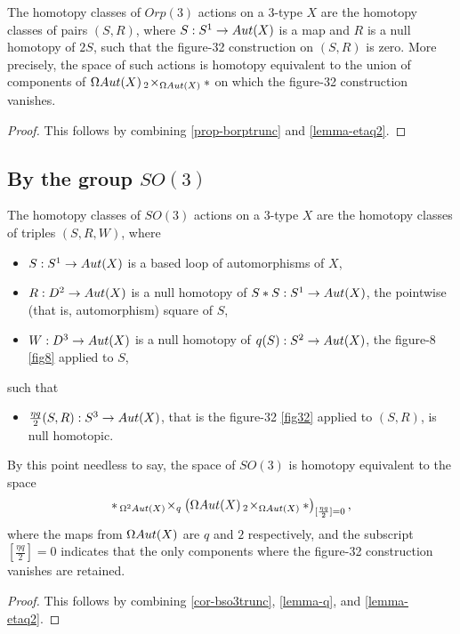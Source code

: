 \documentclass{amsart}
\begin{document}
\begin{proposition} 
\label{prop-orpaction}
The homotopy classes of $Orp(3)$ actions on a 3-type $X$ are the homotopy classes of pairs $(S,R)$, where $S: S^1 \rightarrow Aut(X)$ is a map and $R$ is a null homotopy of $2S$, such that the figure-32 construction on $(S,R)$ is zero.  More precisely, the space of such actions is homotopy equivalent to the union of components of $\Omega Aut(X) \,_2\! \times_{\Omega Aut(X)} \ast$ on which the figure-32 construction vanishes.
\end{proposition}
\begin{proof}
This follows by combining \cref{prop-borptrunc} and \cref{lemma-etaq2}.
\end{proof}



\subsection{By the group $SO(3)$}

\begin{theorem}[Actions of $SO(3)$] 
\label{thm-so3action}
The homotopy classes of $SO(3)$ actions on a 3-type $X$ are the homotopy classes of triples $(S,R,W)$, where 
\begin{itemize}
\item $S: S^1 \rightarrow Aut(X)$ is a based loop of automorphisms of $X$,
\item $R: D^2 \rightarrow Aut(X)$ is a null homotopy of $S \ast S: S^1 \rightarrow Aut(X)$, the pointwise (that is, automorphism) square of $S$,
\item $W: D^3 \rightarrow Aut(X)$ is a null homotopy of $q(S): S^2 \rightarrow Aut(X)$, the figure-8 \cref{fig8} applied to $S$,
\end{itemize}
such that
\begin{itemize}
\item $\frac{\eta q}{2} (S,R) : S^3 \rightarrow Aut(X)$, that is the figure-32 \cref{fig32} applied to $(S,R)$, is null homotopic.
\end{itemize}
\end{theorem}
\nid By this point needless to say, the space of $SO(3)$ is homotopy equivalent to the space
\[
\ast \,_{\Omega^2 Aut(X)}\! \times_q \left(\Omega Aut(X) \,_2\! \times_{\Omega Aut(X)} \ast\right)_{[\frac{\eta q}{2}]=0},
\]
where the maps from $\Omega Aut(X)$ are $q$ and $2$ respectively, and the subscript $[\frac{\eta q}{2}]=0$ indicates that the only components where the figure-32 construction vanishes are retained.
\begin{proof}
This follows by combining \cref{cor-bso3trunc}, \cref{lemma-q}, and \cref{lemma-etaq2}.
\end{proof}
\end{document}
